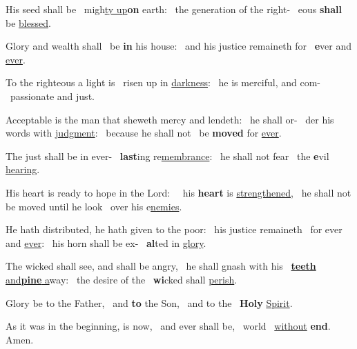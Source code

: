 \documentclass[12pt]{article} %
\def\noinitial{%
\gresetfirstlineaboveinitial{\textcolor{benred8}{\small \textsc{\textbf{}}}}{\textcolor{benred8}{\small \textsc{\textbf{}}}}
\setspaceafterinitial{0pt plus 0em minus 0em}%
\setspacebeforeinitial{0pt plus 0em minus 0em}%
\relax %
}
\newenvironment{psalmtext}{\leftskip 0.25in}{\vspace{2 mm}}
\def\pipe{\textcolor{benred8}{\textdoublepipe}}
\let\oldgresixstar\gresixstar
\renewcommand{\gresixstar}{\textcolor{benred8}{\oldgresixstar}}
\let\oldgredagger\gredagger
\renewcommand{\gredagger}{\textcolor{benred8}{\oldgredagger}}
\begin{document}
\begin{pages}
\begin{Rightside}
\begin{psalmtext}

His seed shall be \pipe\ migh\uline{ty up}\textbf{on} earth: \gresixstar\ the generation of the right- \pipe\ eous \textbf{shall} be \uline{blessed}.

Glory and wealth shall \pipe\ be \textbf{in} his house: \gresixstar\ and his justice remaineth for \pipe\ \textbf{e}ver and \uline{ever}.

To the righteous a light is \pipe\ risen up in \uline{darkness}: \gresixstar\ he is merciful, and com- \pipe\ passionate and just.

Acceptable is the man that sheweth mercy and lendeth: \gredagger\ he shall or- \pipe\ der his words with \uline{judgment}: \gresixstar\ because he shall not \pipe\ be \textbf{moved} for \uline{ever}.

The just shall be in ever- \pipe\ \textbf{last}ing re\underline{membrance}: \gresixstar\ he shall not fear \pipe\ the \textbf{e}vil \uline{hearing}.

His heart is ready to hope in the Lord: \gredagger\ \pipe\ his \textbf{heart} is \uline{strengthened}, \gresixstar\ he shall not be moved until he look \pipe\ over his e\uline{nemies}.

He hath distributed, he hath given to the poor: \gredagger\ his justice remaineth \pipe\ for ever and \uline{ever}: \gresixstar\ his horn shall be ex- \pipe\ \textbf{al}ted in \uline{glory}.

The wicked shall see, and shall be angry, \gredagger\ he shall gnash with his \pipe\ \uline{\textbf{teeth} and}\hspace{2mm}\uline{\textbf{pine} a}way: \gresixstar\ the desire of the \pipe\ \textbf{wi}cked shall \uline{perish}.

Glory be to the Father, \pipe\ and \textbf{to} the Son, \gresixstar\ and to the \pipe\ \textbf{Holy} \uline{Spirit}.

As it was in the beginning, is now, \pipe\ and ever shall be, \gresixstar\ world \pipe\ \uline{without} \textbf{end}. Amen.

\end{psalmtext}

\pend\pstart

{\noinitial
{}
}

\pend\pstart


\end{Rightside}
\end{pages}
\end{document}
